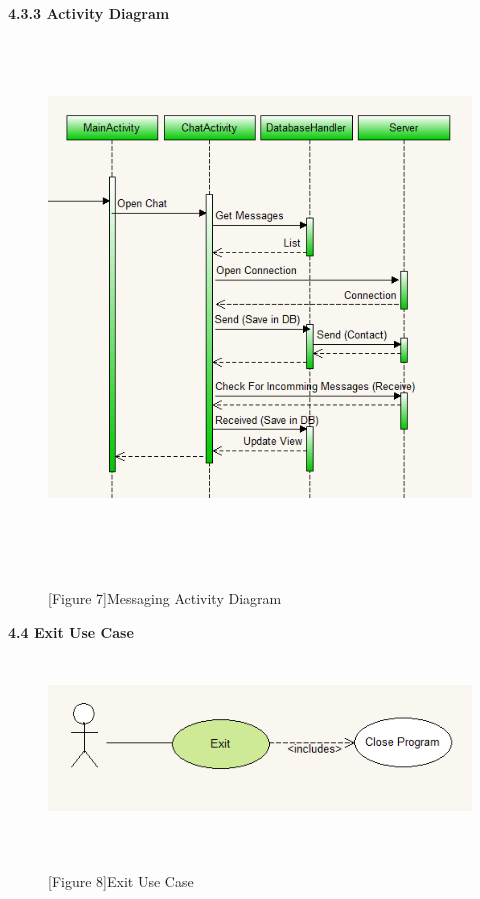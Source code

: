 \documentclass[29pt,a4paper]{moderncv}
\begin{document}
\newpage
		\textbf{4.3.3 Activity Diagram}
			\begin{figure}
				\centering
				\\ \includegraphics[width=5.5in, height=5.0in]{./mesActivity.png}
				\\\caption{[Figure 7]Messaging Activity Diagram}\\
			\end{figure}	
		
\newpage		
	\left\textbf{4.4 Exit Use Case}
		\begin{figure}
			\centering
			\\ \includegraphics[width=6.0in, height=1.5in]{./exitCase.png}
			\\\caption{[Figure 8]Exit Use Case}\\
		\end{figure}
		
\end{document}
